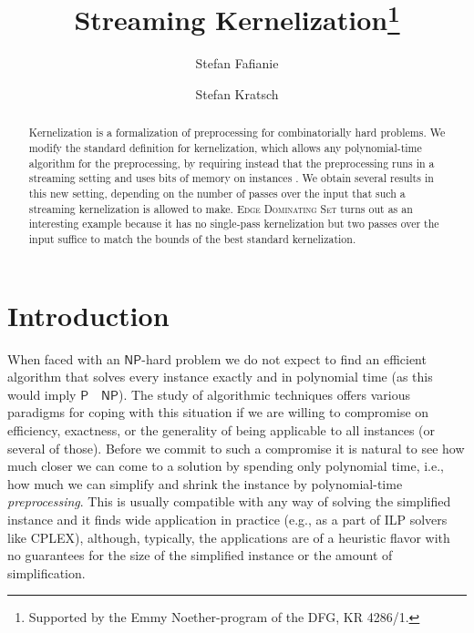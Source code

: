 \documentclass[draft,a4paper]{llncs}
\title{\texorpdfstring{Streaming Kernelization\thanks{Supported by the Emmy Noether-program of the DFG, KR 4286/1.}}{Streaming Kernelization}}
\author{Stefan Fafianie \and Stefan Kratsch}
\institute{TU Berlin, Germany, \texttt{stefan.fafianie,stefan.kratsch@tu-berlin.de}}
\newcommand{\NP}{\ensuremath{\mathsf{NP}}\xspace}
\renewcommand{\P}{\ensuremath{\mathsf{P}}\xspace}
\begin{document}
\maketitle

\begin{abstract}
Kernelization is a formalization of preprocessing for combinatorially hard problems. We modify the standard definition for kernelization, which allows any polynomial-time algorithm for the preprocessing, by requiring instead that the preprocessing runs in a streaming setting and uses  bits of memory on instances . We obtain several results in this new setting, depending on the number of passes over the input that such a streaming kernelization is allowed to make. \textsc{Edge Dominating Set} turns out as an interesting example because it has no single-pass kernelization but two passes over the input suffice to match the bounds of the best standard kernelization. 

\end{abstract}

\section{Introduction}

When faced with an \NP-hard problem we do not expect to find an efficient algorithm that solves every instance exactly and in polynomial time (as this would imply \P~~\NP). The study of algorithmic techniques offers various paradigms for coping with this situation if we are willing to compromise on efficiency, exactness, or the generality of being applicable to all instances (or several of those). Before we commit to such a compromise it is natural to see how much closer we can come to a solution by spending only polynomial time, i.e., how much we can simplify and shrink the instance by polynomial-time \emph{preprocessing}. This is usually compatible with any way of solving the simplified instance and it finds wide application in practice (e.g., as a part of ILP solvers like CPLEX), although, typically, the applications are of a heuristic flavor with no guarantees for the size of the simplified instance or the amount of simplification.
\end{document}

